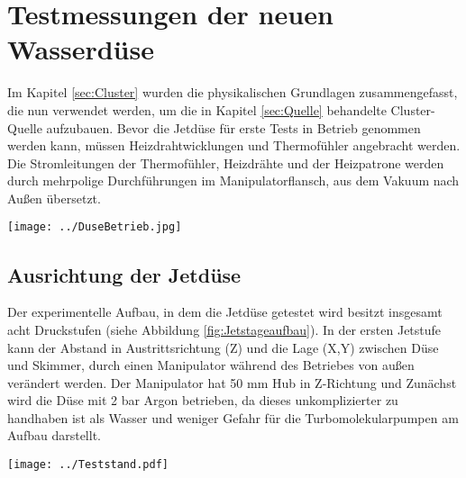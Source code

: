 \section{Testmessungen der neuen Wasserdüse}

Im Kapitel \ref{sec:Cluster} wurden die physikalischen Grundlagen zusammengefasst, die nun verwendet werden, um die in Kapitel \ref{sec:Quelle} behandelte Cluster-Quelle aufzubauen.
Bevor die Jetdüse für erste Tests in Betrieb genommen werden kann, müssen Heizdrahtwicklungen und Thermofühler angebracht werden. Die Stromleitungen der Thermofühler, Heizdrähte und der Heizpatrone werden durch mehrpolige Durchführungen im Manipulatorflansch, aus dem Vakuum nach Außen übersetzt. 

\begin{center}
\begin{minipage}{\linewidth}
\centering
\texttt{[image: ../DuseBetrieb.jpg]}%
 \label{fig:DuseBetrieb}
\end{minipage} 
\end{center} 

\subsection{Ausrichtung der Jetdüse} \label{sec:Ausrichtung der Jetduse}

Der experimentelle Aufbau, in dem die Jetdüse getestet wird besitzt insgesamt acht Druckstufen (siehe Abbildung \ref{fig:Jetstageaufbau}). In der ersten Jetstufe kann der Abstand in Austrittsrichtung (Z) und die Lage (X,Y) zwischen Düse und Skimmer, durch einen Manipulator während des Betriebes von außen verändert werden. Der Manipulator hat 50 mm Hub in Z-Richtung und  Zunächst wird die Düse mit 2 bar Argon betrieben, da dieses unkomplizierter zu handhaben ist als Wasser und weniger Gefahr für die Turbomolekularpumpen am Aufbau darstellt. 

\begin{center}
\begin{minipage}{\linewidth}
\centering
\texttt{[image: ../Teststand.pdf]}%
 \label{fig:Teststand2}
\end{minipage} 
\end{center} 

